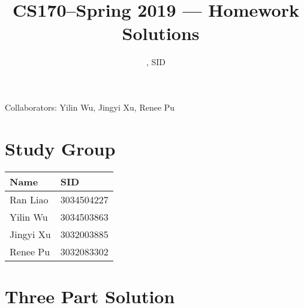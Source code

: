 \documentclass[11pt]{article}
\title{CS170--Spring 2019 --- Homework \Homework\ Solutions}
\author{\Name, SID \SID}
\date{}
\begin{document}
\maketitle
Collaborators: Yilin Wu, Jingyi Xu, Renee Pu

\section{Study Group}
\begin{tabular}{ll}
    Name        &   SID         \\\hline
    Ran Liao    &   3034504227  \\  
    Yilin Wu    &   3034503863  \\
    Jingyi Xu   &   3032003885  \\
    Renee Pu    &   3032083302  \\
\end{tabular}



\newpage
\section{Three Part Solution}

\newpage
\end{document}
